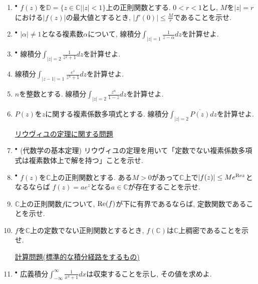\documentclass[dvipdfmx,a4paper,11pt]{article}
\newcommand{\C}{\mathbb{C}}
\newcommand{\D}{\mathbb{D}}
\theoremstyle{definition}
\begin{document}
\begin{enumerate}[label=\textbf{問}2.\arabic*]



\item $^{\bullet}$ $f(z)$を$\D= \{ z \in \C | |z|<1\}$上の正則関数とする.
 $0 < r<1$とし, $M$を$|z|=r$における$|f(z)|$の最大値とするとき, $|f'(0)| \le \frac{M}{r}$であることを示せ.
 

\item $^{\bullet}$ $|\alpha|\neq 1$となる複素数$\alpha$について, 線積分$\int_{|z|=1} \frac{1}{z-\alpha} dz $を計算せよ.


\item $^{\bullet}$ 線積分$\int_{|z|=2} \frac{1}{z^2 + 1} dz $を計算せよ. 
\item  線積分$\int_{|z-1|=1} \frac{e^z}{z^4 + 1} dz $を計算せよ. 
\item $n$を整数とする. 線積分$\int_{|z|=2} \frac{z^n}{1-z} dz $を計算せよ. 
\item $P(z)$を$z$に関する複素係数多項式とする. 線積分$\int_{|z|=2} \overline{P(z)} dz $を計算せよ. 


 
 
 \vspace{12pt}
\hspace{-36pt}\underline{リウヴィユの定理に関する問題}

\item$^{\bullet}$ (代数学の基本定理) リウヴィユの定理を用いて「定数でない複素係数多項式は複素数体上で解を持つ」ことを示せ. 

 \item $^{\bullet}$ $f(z)$を$\C$上の正則関数とする. ある$M>0$があって$\C$上で$|f(z)| \le M e^{{\rm Re}z}$となるならば
 $f(z) = a e^{z}$となる$a \in \C$が存在することを示せ. 
 
 \item $\C$上の正則関数$f$について, ${\rm Re}(f)$が下に有界であるならば, 定数関数であることを示せ. 

 \item $f$を$\C$上の定数でない正則関数とするとき, $f(\C)$は$\C$上稠密であることを示せ. 
 
 

 
 
 \vspace{12pt}
\hspace{-36pt}\underline{計算問題(標準的な積分経路をするもの)}

 
 \item  $^{\bullet}$ 広義積分$\int_{ - \infty}^{\infty}\frac{1}{x^4+ 1} dx$は収束することを示し, その値を求めよ.
    

\end{enumerate}
\end{document}
